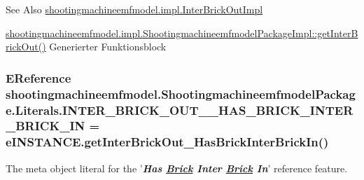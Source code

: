 \begin{DoxySeeAlso}{See Also}
\hyperlink{classshootingmachineemfmodel_1_1impl_1_1_inter_brick_out_impl}{shootingmachineemfmodel.\-impl.\-Inter\-Brick\-Out\-Impl} 

\hyperlink{classshootingmachineemfmodel_1_1impl_1_1_shootingmachineemfmodel_package_impl_a8213bce7c3c0e456759def0df96884a9}{shootingmachineemfmodel.\-impl.\-Shootingmachineemfmodel\-Package\-Impl\-::get\-Inter\-Brick\-Out()} Generierter Funktionsblock 
\end{DoxySeeAlso}
\hypertarget{interfaceshootingmachineemfmodel_1_1_shootingmachineemfmodel_package_1_1_literals_a1d7df3786e32cbcd1e6b6c767feda7f1}{
\subsubsection[{I\-N\-T\-E\-R\-\_\-\-B\-R\-I\-C\-K\-\_\-\-O\-U\-T\-\_\-\-\_\-\-H\-A\-S\-\_\-\-B\-R\-I\-C\-K\-\_\-\-I\-N\-T\-E\-R\-\_\-\-B\-R\-I\-C\-K\-\_\-\-I\-N}]{\setlength{\rightskip}{0pt plus 5cm}E\-Reference shootingmachineemfmodel.\-Shootingmachineemfmodel\-Package.\-Literals.\-I\-N\-T\-E\-R\-\_\-\-B\-R\-I\-C\-K\-\_\-\-O\-U\-T\-\_\-\-\_\-\-H\-A\-S\-\_\-\-B\-R\-I\-C\-K\-\_\-\-I\-N\-T\-E\-R\-\_\-\-B\-R\-I\-C\-K\-\_\-\-I\-N = e\-I\-N\-S\-T\-A\-N\-C\-E.\-get\-Inter\-Brick\-Out\-\_\-\-Has\-Brick\-Inter\-Brick\-In()}}\label{interfaceshootingmachineemfmodel_1_1_shootingmachineemfmodel_package_1_1_literals_a1d7df3786e32cbcd1e6b6c767feda7f1}
The meta object literal for the '{\itshape {\bfseries Has \hyperlink{interfaceshootingmachineemfmodel_1_1_brick}{Brick} Inter \hyperlink{interfaceshootingmachineemfmodel_1_1_brick}{Brick} In}}' reference feature.

